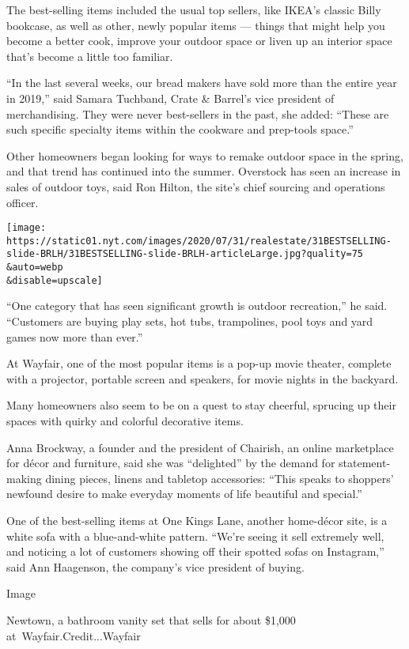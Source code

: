 The best-selling items included the usual top sellers, like IKEA's
classic Billy bookcase, as well as other, newly popular items --- things
that might help you become a better cook, improve your outdoor space or
liven up an interior space that's become a little too familiar.

``In the last several weeks, our bread makers have sold more than the
entire year in 2019,'' said Samara Tuchband, Crate \& Barrel's vice
president of merchandising. They were never best-sellers in the past,
she added: ``These are such specific specialty items within the cookware
and prep-tools space.''

Other homeowners began looking for ways to remake outdoor space in the
spring, and that trend has continued into the summer. Overstock has seen
an increase in sales of outdoor toys, said Ron Hilton, the site's chief
sourcing and operations officer.

\texttt{[image: https://static01.nyt.com/images/2020/07/31/realestate/31BESTSELLING-slide-BRLH/31BESTSELLING-slide-BRLH-articleLarge.jpg?quality=75\\\&auto=webp\\\&disable=upscale]}

``One category that has seen significant growth is outdoor recreation,''
he said. ``Customers are buying play sets, hot tubs, trampolines, pool
toys and yard games now more than ever.''

At Wayfair, one of the most popular items is a pop-up movie theater,
complete with a projector, portable screen and speakers, for movie
nights in the backyard.

Many homeowners also seem to be on a quest to stay cheerful, sprucing up
their spaces with quirky and colorful decorative items.

Anna Brockway, a founder and the president of Chairish, an online
marketplace for décor and furniture, said she was ``delighted'' by the
demand for statement-making dining pieces, linens and tabletop
accessories: ``This speaks to shoppers' newfound desire to make everyday
moments of life beautiful and special.''

One of the best-selling items at One Kings Lane, another home-décor
site, is a white sofa with a blue-and-white pattern. ``We're seeing it
sell extremely well, and noticing a lot of customers showing off their
spotted sofas on Instagram,'' said Ann Haagenson, the company's vice
president of buying.

Image

Newtown, a bathroom vanity set that sells for about \$1,000
at~Wayfair.Credit...Wayfair

